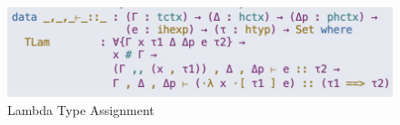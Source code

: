 \begin{figure}[ht]
	\includegraphics[scale=0.75,valign=t]{imgs/agda-lambda.png}
	\caption{Lambda Type Assignment}
	\label{fig:agda-lambda}
\end{figure}